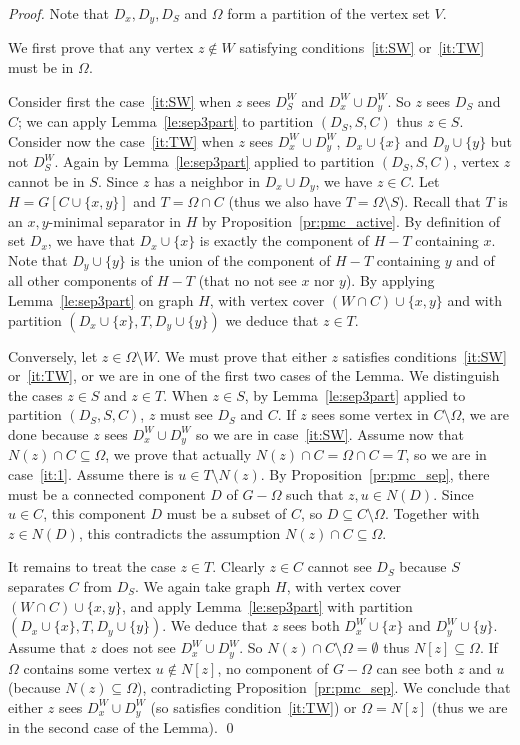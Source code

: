 \documentclass{llncs}
\newcommand{\sm}{\setminus}
\begin{document}
\begin{proof}


Note that $D_x, D_y, D_S$ and $\Omega$ form a partition of the vertex set $V$.

We first prove that any vertex $z \not\in W$ satisfying conditions~\ref{it:SW} or~\ref{it:TW} must be in $\Omega$. 

Consider first the case~\ref{it:SW} when $z$ sees $D_S^W$ and $D_x^W \cup D_y^W$. So $z$ sees $D_S$ and $C$; we can apply Lemma~\ref{le:sep3part} to partition $(D_S,S,C)$ 
thus $z \in S$.
Consider now the case~\ref{it:TW} when $z$ sees $D_x^W \cup D_y^W$, $D_x\cup \{x\}$ and $D_y \cup \{y\}$ but not $D_S^W$. Again by Lemma~\ref{le:sep3part} applied to partition $(D_S,S,C)$, vertex $z$ cannot be in $S$. Since $z$ has a neighbor in $D_x \cup D_y$, we have $z \in C$. Let $H = G[C \cup \{x,y\}]$ and $T = \Omega \cap C$ (thus we also have $T = \Omega \setminus S$). Recall that $T$ is an $x,y$-minimal separator in $H$ by Proposition~\ref{pr:pmc_active}. By definition of set $D_x$, we have that $D_x \cup \{x\}$ is exactly the component of $H - T$ containing $x$. Note that $D_y \cup \{y\}$ is the union of the component of $H - T$  containing $y$ and of all other components of $H - T$ (that no not see $x$ nor $y$). By applying Lemma~\ref{le:sep3part} on graph $H$, with vertex cover $(W \cap C) \cup \{x,y\}$ and with partition $(D_x \cup \{x\}, T, D_y \cup \{y\})$ we deduce that $z \in T$. 

Conversely, let $z \in \Omega \sm W$. We must prove that either $z$ satisfies conditions~\ref{it:SW} or~\ref{it:TW}, or we are in one of the first two cases of the Lemma. 
We distinguish the cases $z \in S$ and $z \in T$. When $z \in S$, by Lemma~\ref{le:sep3part} applied to partition $(D_S,S,C)$, $z$ must see $D_S$ and $C$. If $z$ sees some vertex in $C \setminus \Omega$, we are done because $z$ sees  $D_x^W \cup D_y^W$ so we are in case~\ref{it:SW}. Assume now that $N(z) \cap C \subseteq \Omega$, we prove that actually $N(z) \cap C = \Omega \cap C = T$, so we are in case~\ref{it:1}. Assume there is $u \in T \setminus N(z)$. By Proposition~\ref{pr:pmc_sep}, there must be a connected component $D$ of $G - \Omega$ such that $z,u \in N(D)$. Since $u \in C$, this component $D$ must be a subset of $C$, so $D \subseteq C \sm \Omega$. Together with $z \in N(D)$, this contradicts the assumption $N(z) \cap C \subseteq \Omega$. 

It remains to treat the case $z \in T$. Clearly $z \in C$ cannot see $D_S$ because $S$ separates $C$ from $D_S$. 
We again take graph $H$, with vertex cover $(W \cap C) \cup \{x,y\}$, and apply Lemma~\ref{le:sep3part} with partition $(D_x \cup \{x\}, T, D_y \cup \{y\})$. We deduce that $z$ sees both  $D_x^W \cup \{x\}$ and
$D_y^W \cup \{y\}$. Assume that $z$ does not see $D_x^W \cup D_y^W$. So $N(z) \cap C \setminus \Omega = \emptyset$ thus $N[z] \subseteq \Omega$. 
If $\Omega$ contains some vertex $u \not\in N[z]$, no component of $G - \Omega$ can see both $z$ and $u$ (because $N(z) \subseteq \Omega$), contradicting Proposition~\ref{pr:pmc_sep}. We conclude that either $z$ sees $D_x^W \cup D_y^W$ (so satisfies condition~\ref{it:TW}) or $\Omega = N[z]$ (thus we are in the second case of the Lemma).
\qed
\end{proof}
\end{document}

